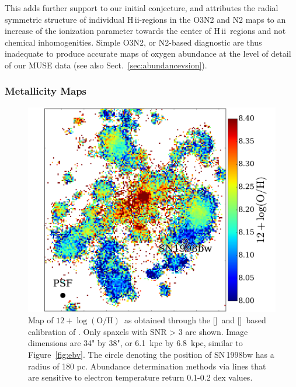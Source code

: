 \documentclass[traditabstract]{aa}
\newcommand{\hii}{\mbox{H\,{\sc ii}}}
\newcommand{\oh}{$12+\log(\mathrm{O/H})$}
\newcommand{\sii}{[\ion{S}{ii}]}
\newcommand{\nii}{[\ion{N}{ii}]}
\begin{document}
This adds further support to our initial conjecture, and attributes the radial symmetric structure of individual \hii-regions in the O3N2 and N2 maps to an increase of the ionization parameter towards the center of \hii~regions and not chemical inhomogenities. Simple O3N2, or N2-based diagnostic are thus inadequate to produce accurate maps of oxygen abundance at the level of detail of our MUSE data (see also Sect.~\ref{sec:abundancevsion}).

\subsubsection{Metallicity Maps}
\label{sec:mapoh}

\begin{figure}
\includegraphics[angle=0, width=0.99\columnwidth]{Figs/MUSE_SN1998bw_OH.pdf}
\caption{Map of \oh\, as obtained through the \sii\, and \nii\, based calibration of \citet{2016Ap&SS.361...61D}. Only spaxels with SNR > 3 are shown. Image dimensions are 34" by 38", or 6.1~kpc by 6.8~kpc, similar to Figure~\ref{fig:ebv}. The circle denoting the position of SN\,1998bw has a radius of 180 pc. Abundance determination methods via lines that are sensitive to electron temperature return 0.1-0.2 dex values.}
\label{fig:s2}
\end{figure}
\end{document}
